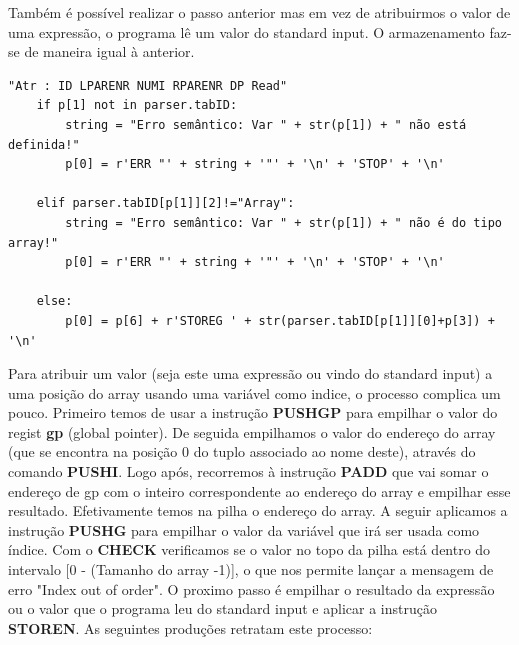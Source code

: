 \documentclass{article}
\begin{document}
\par Também é possível realizar o passo anterior mas em vez de atribuirmos o valor de uma expressão, o programa lê um valor do standard input. O armazenamento faz-se de maneira igual à anterior.

\begin{lstlisting}[firstnumber=220]
"Atr : ID LPARENR NUMI RPARENR DP Read"
    if p[1] not in parser.tabID:
        string = "Erro semântico: Var " + str(p[1]) + " não está definida!"
        p[0] = r'ERR "' + string + '"' + '\n' + 'STOP' + '\n'

    elif parser.tabID[p[1]][2]!="Array":
        string = "Erro semântico: Var " + str(p[1]) + " não é do tipo array!"
        p[0] = r'ERR "' + string + '"' + '\n' + 'STOP' + '\n'

    else:
        p[0] = p[6] + r'STOREG ' + str(parser.tabID[p[1]][0]+p[3]) + '\n'
\end{lstlisting}

Para atribuir um valor (seja este uma expressão ou vindo do standard input) a uma posição do array usando uma variável como indice, o processo complica um pouco. Primeiro temos de usar a instrução \textbf{PUSHGP} para empilhar o valor do regist \textbf{gp} (global pointer). De seguida empilhamos o valor do endereço do array (que se encontra na posição 0 do tuplo associado ao nome deste), através do comando \textbf{PUSHI}. Logo após, recorremos à instrução \textbf{PADD} que vai somar o endereço de gp com o inteiro correspondente ao endereço do array e empilhar esse resultado. Efetivamente temos na pilha o endereço do array. A seguir aplicamos a instrução \textbf{PUSHG} para empilhar o valor da variável que irá ser usada como índice. Com o \textbf{CHECK} verificamos se o valor no topo da pilha está dentro do intervalo [0 - (Tamanho do array -1)], o que nos permite lançar a mensagem de erro "Index out of order". O proximo passo é empilhar o resultado da expressão ou o valor que o programa leu do standard input e aplicar a instrução \textbf{STOREN}.
As seguintes produções retratam este processo:
\end{document}
